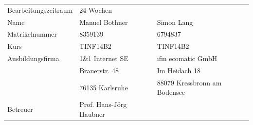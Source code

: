 \begin{flushleft}
	\begin{tabular}{p{4cm} p{6cm} p{6cm}}
		Bearbeitungszeitraum & 24 Wochen  &\\
		Name & Manuel Bothner & Simon Lang\\
		Matrikelnummer & 8359139 & 6794837\\
		Kurs & TINF14B2 & TINF14B2\\
		Ausbildungsfirma & 1\&1 Internet SE & ifm ecomatic GmbH\\
		& Brauerstr. 48 & Im Heidach 18\\
		& 76135 Karlsruhe & 88079 Kressbronn am Bodensee\\
		Betreuer & Prof. Hans-Jörg Haubner & \\
	\end{tabular}
\end{flushleft}